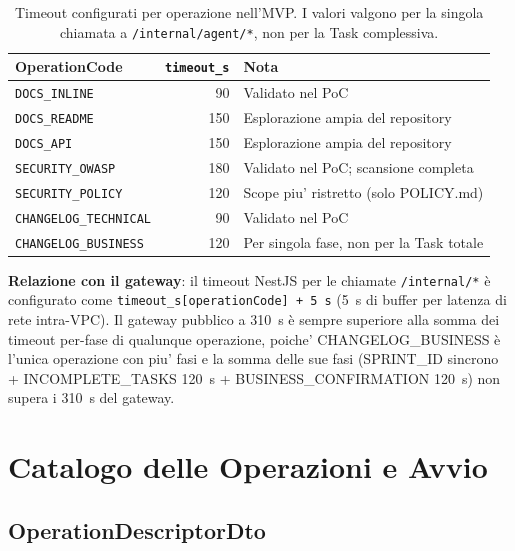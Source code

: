 \documentclass[11pt,a4paper]{article}
\begin{document}
\begin{table}[H]
\centering
\caption{Timeout configurati per operazione nell'MVP. I valori valgono per la singola chiamata a \texttt{/internal/agent/*}, non per la Task complessiva.}
\label{tab:be-timeout-op}
\vspace{2mm}
\renewcommand{\arraystretch}{1.2}
\begin{tabularx}{\textwidth}{|l|r|X|}
\hline
\textbf{OperationCode} & \textbf{\texttt{timeout\_s}} & \textbf{Nota} \\ \hline
\texttt{DOCS\_INLINE}          & 90  & Validato nel PoC \\ \hline
\texttt{DOCS\_README}          & 150 & Esplorazione ampia del repository \\ \hline
\texttt{DOCS\_API}             & 150 & Esplorazione ampia del repository \\ \hline
\texttt{SECURITY\_OWASP}       & 180 & Validato nel PoC; scansione completa \\ \hline
\texttt{SECURITY\_POLICY}      & 120 & Scope piu' ristretto (solo POLICY.md) \\ \hline
\texttt{CHANGELOG\_TECHNICAL}  & 90  & Validato nel PoC \\ \hline
\texttt{CHANGELOG\_BUSINESS}   & 120 & Per singola fase, non per la Task totale \\ \hline
\end{tabularx}
\end{table}

\textbf{Relazione con il gateway}: il timeout NestJS per le chiamate \texttt{/internal/*} è configurato come \texttt{timeout\_s[operationCode] + 5~s} (5~s di buffer per latenza di rete intra-VPC). Il gateway pubblico a 310~s è sempre superiore alla somma dei timeout per-fase di qualunque operazione, poiche' CHANGELOG\_BUSINESS è l'unica operazione con piu' fasi e la somma delle sue fasi (SPRINT\_ID sincrono + INCOMPLETE\_TASKS 120~s + BUSINESS\_CONFIRMATION 120~s) non supera i 310~s del gateway.

\section{Catalogo delle Operazioni e Avvio}
\label{sec:be-operazioni}

\subsection{OperationDescriptorDto}
\end{document}
